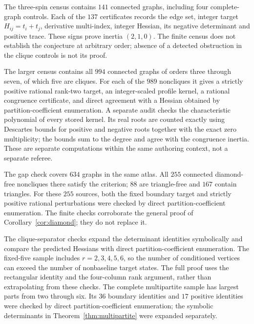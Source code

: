 \documentclass[11pt]{article}
\theoremstyle{remark}
\begin{document}
The three-spin census contains $141$ connected graphs, including four
complete-graph controls. Each of the $137$ certificates records the
edge set, integer target $H_{ij}=t_i+t_j$, derivative multi-index,
integer Hessian, its negative determinant and positive trace.
These signs prove inertia $(2,1,0)$. The finite census does not
establish the conjecture at arbitrary order; absence of a detected
obstruction in the clique controls is not its proof.

The larger census contains all $994$ connected graphs of orders
three through seven, of which five are cliques. For each of the
$989$ noncliques it gives a strictly positive rational rank-two
target, an integer-scaled profile kernel, a rational congruence
certificate, and direct agreement with a Hessian obtained by
partition-coefficient enumeration. A separate audit checks the
characteristic polynomial of every stored kernel. Its real roots
are counted exactly using Descartes bounds for positive and negative
roots together with the exact zero multiplicity; the bounds sum to
the degree and agree with the congruence inertia. These are separate
computations within the same authoring context, not a separate referee.

The gap check covers $634$ graphs in the same atlas. All $255$
connected diamond-free noncliques there satisfy the criterion;
$88$ are triangle-free and $167$ contain triangles. For these
$255$ sources, both the fixed boundary target and strictly positive
rational perturbations were checked by direct partition-coefficient
enumeration. The finite checks corroborate the general proof of
Corollary~\ref{cor:diamond}; they do not replace it.

The clique-separator checks expand the determinant identities
symbolically and compare the predicted Hessians with direct
partition-coefficient enumeration. The fixed-five sample includes
$r=2,3,4,5,6$, so the number of conditioned vertices can exceed
the number of nonbaseline target states. The full proof uses the
rectangular identity and the four-column rank argument, rather
than extrapolating from these checks.
The complete multipartite sample has largest parts from two through six.
Its $36$ boundary identities and $17$ positive identities were checked
by direct partition-coefficient enumeration; the symbolic determinants
in Theorem~\ref{thm:multipartite} were expanded separately.
\end{document}
